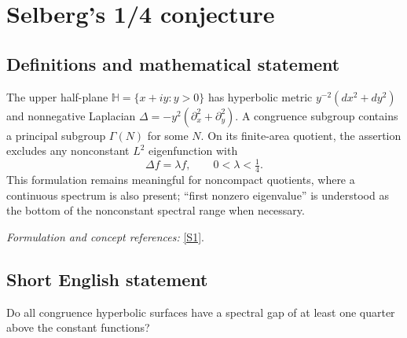 \documentclass[11pt]{article}
\newcommand{\sref}[2]{\hyperlink{source:#1:#2}{[S#2]}}
\newif\ifshowcatalogue
\newcommand{\cataloguescope}[1]{\ifshowcatalogue
 \paragraph{Exact scope in the supplied catalogue.}
 \begin{quote}\small #1\end{quote}\fi}
\begin{document}
\setcounter{section}{0}
\clearpage
\section*{\texorpdfstring{Selberg's 1/4 conjecture}{Selberg's 1/4 conjecture}}\label{9400079}
\subsection{Definitions and mathematical statement}
The upper half-plane $\mathbb H=\{x+iy:y>0\}$ has hyperbolic metric $y^{-2}(dx^2+dy^2)$ and nonnegative Laplacian $\Delta=-y^2(\partial_x^2+\partial_y^2)$. A congruence subgroup contains a principal subgroup $\Gamma(N)$ for some $N$. On its finite-area quotient, the assertion excludes any nonconstant $L^2$ eigenfunction with
\[
 \Delta f=\lambda f,\qquad0<\lambda<\tfrac14.
\]
This formulation remains meaningful for noncompact quotients, where a continuous spectrum is also present; ``first nonzero eigenvalue'' is understood as the bottom of the nonconstant spectral range when necessary.
\par\smallskip\textit{Formulation and concept references:} \sref{9400079}{1}.
\cataloguescope{Prove that the first nonzero eigenvalue lambda\_1 of the Laplace-Beltrami operator on every congruence quotient of the upper half-plane is at least 1/4.}

\subsection{Short English statement}
Do all congruence hyperbolic surfaces have a spectral gap of at least one quarter above the constant functions?
\end{document}
